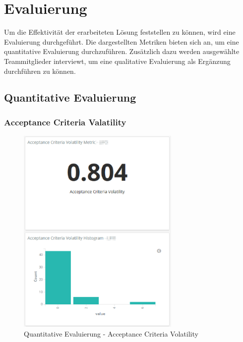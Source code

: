 \chapter{Evaluierung}

Um die Effektivität der erarbeiteten Lösung feststellen zu können, wird eine Evaluierung durchgeführt.
Die dargestellten Metriken bieten sich an, um eine quantitative Evaluierung durchzuführen.
Zusätzlich dazu werden ausgewählte Teammitglieder interviewt, um eine qualitative Evaluierung als Ergänzung durchführen zu können.

\clearpage
\section{Quantitative Evaluierung}
\subsection*{Acceptance Criteria Valatility}

\begin{savenotes}
    \begin{figure}[H]
      \centering
      \includegraphics[width=0.7\textwidth]{img/eval-ac-volatility.png}
      \caption{Quantitative Evaluierung {-} Acceptance Criteria Volatility}\label{fig:eval_ac_volatility}
    \end{figure}
\end{savenotes}


